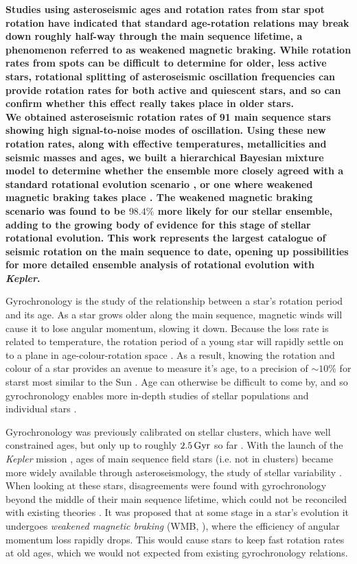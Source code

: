 \documentclass[12pt]{article}
\begin{document}
\textbf{Studies using asteroseismic ages and rotation rates from star spot rotation have indicated that standard age-rotation relations may break down roughly half-way through the main sequence lifetime, a phenomenon referred to as weakened magnetic braking. While rotation rates from spots can be difficult to determine for older, less active stars, rotational splitting of asteroseismic oscillation frequencies can provide rotation rates for both active and quiescent stars, and so can confirm whether this effect really takes place in older stars.\\
We obtained asteroseismic rotation rates of 91 main sequence stars showing high signal-to-noise modes of oscillation.
Using these new rotation rates, along with effective temperatures, metallicities and seismic masses and ages, we built a hierarchical Bayesian mixture model to determine whether the ensemble more closely agreed with a standard rotational evolution scenario \cite{vansaders+pinsonneault2013}, or one where weakened magnetic braking takes place \cite{vansaders+2016}. The weakened magnetic braking scenario was found to be $98.4\%$ more likely for our stellar ensemble, adding to the growing body of evidence for this stage of stellar rotational evolution. This work represents the largest catalogue of seismic rotation on the main sequence to date, opening up possibilities for more detailed ensemble analysis of rotational evolution with \textit{Kepler}.}

Gyrochronology is the study of the relationship between a star's rotation period and its age. As a star grows older along the main sequence, magnetic winds will cause it to lose angular momentum, slowing it down. Because the loss rate is related to temperature, the rotation period of a young star will rapidly settle on to a plane in age-colour-rotation space \cite{barnes2007}. As a result, knowing the rotation and colour of a star provides an avenue to measure it's age, to a precision of $\sim 10\%$ for starst most similar to the Sun \cite{meibom+2015}. Age can otherwise be difficult to come by, and so gyrochronology enables more in-depth studies of stellar populations and individual stars \cite{leiner+2019,claytor+2019}.

Gyrochronology was previously calibrated on stellar clusters, which have well constrained ages, but only up to roughly $2.5\, \rm{Gyr}$ so far \cite{meibom+2015}. With the launch of the \textit{Kepler} mission \cite{borucki+2010}, ages of main sequence field stars (i.e. not in clusters) became more widely available through asteroseismology, the study of stellar variability \cite{silvaaguirre+2015}. When looking at these stars, disagreements were found with gyrochronology beyond the middle of their main sequence lifetime, which could not be reconciled with existing theories \cite{angus+2015, nielsen+2015, davies+2015}. It was proposed that at some stage in a star's evolution it undergoes \textit{weakened magnetic braking} (WMB, \cite{vansaders+2016}), where the efficiency of angular momentum loss rapidly drops. This would cause stars to keep fast rotation rates at old ages, which we would not expected from existing gyrochronology relations.
\end{document}
